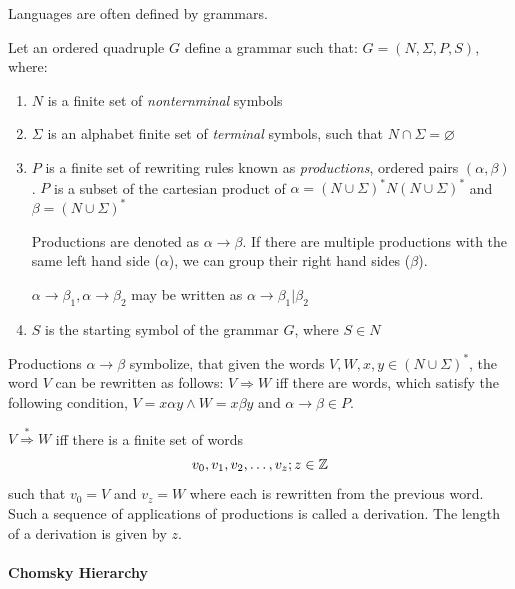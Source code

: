 Languages are often defined by grammars.
\begin{definition}[Grammar]
\label{def:grammar}
\cite{formal_languages}
Let an ordered quadruple $G$ define a grammar such that: $G=\left(N, \Sigma, P, S \right)$, where:
\begin{enumerate}
\item $N$ is a finite set of \emph{nonternminal} symbols
\item $\Sigma$ is an alphabet finite set of \emph{terminal} symbols, such that $N \cap \Sigma = \varnothing$
\item $P$ is a finite set of rewriting rules known as \emph{productions}, ordered pairs $\left( \alpha, \beta \right)$.
$P$ is a subset of the cartesian product of $\alpha = \left(N \cup \Sigma\right)^* N \left(N \cup \Sigma\right)^*$ and $\beta = \left(N \cup \Sigma\right)^*$


Productions are denoted as $\alpha \rightarrow \beta$.
If there are multiple productions with the same left hand side ($\alpha$), we can group their right hand sides ($\beta$).


$\alpha \rightarrow \beta_1, \alpha \rightarrow \beta_2$ may be written as $\alpha \rightarrow \beta_1 | \beta_2$

\item $S$ is the starting symbol of the grammar $G$, where $S \in N$
\end{enumerate}
\end{definition}

Productions $\alpha \rightarrow \beta$ symbolize, that given the words $V,W,x,y \in \left( N \cup \Sigma \right)^{*}$, the word $V$ can be rewritten as follows:
$V \Rightarrow W$ iff there are words, which satisfy the following condition, $V=x\alpha y \wedge W=x\beta y$ and $\alpha \rightarrow \beta \in P$.

\begin{definition}[Derivation]
\label{def:derivation}
$V \stackrel{*}{\Rightarrow}  W$ iff there is a finite set of words 
$$ v_0, v_1, v_2, \dots, v_z;\medskip z \in \mathbb{Z}$$
such that $v_0 = V$ and $v_z = W$ where each is rewritten from the previous word. Such a sequence of applications of productions is called a derivation.
The length of a derivation is given by $z$. 
\end{definition}

\paragraph{Chomsky Hierarchy}

